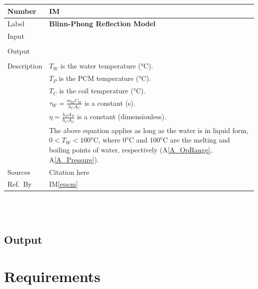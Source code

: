 \documentclass[12pt]{article}
\newcommand{\colAwidth}{0.13\textwidth}
\newcommand{\colBwidth}{0.82\textwidth}
\newcommand{\aref}[1]{A\ref{#1}}
\newcounter{instnum} %
\newcommand{\iref}[1]{IM\ref{#1}}
\begin{document}
\noindent
\begin{minipage}{\textwidth}
	\renewcommand*{\arraystretch}{1.5}
	\begin{tabular}{| p{\colAwidth} | p{\colBwidth}|}
		\hline
		\rowcolor[gray]{0.9}
		Number& IM{instnum}\theinstnum \label{ewat}\\
		\hline
		Label& \bf Blinn-Phong Reflection Model\\
		\hline
		Input& \\
		& \\
		\hline
		Output& \\
		& \\
		\hline
		Description&$T_W$ is the water temperature (\si{\celsius}).\\
		&$T_P$ is the PCM temperature (\si{\celsius}).\\
		&$T_C$ is the coil temperature (\si{\celsius}).\\
		&$\tau_W = \frac{m_W C_W}{h_C A_C}$ is a constant (\si{\second}).\\
		&$\eta = \frac{h_P A_P}{h_C A_C}$ is a constant (dimensionless).\\
		& The above equation applies as long as the water is in liquid form,
		$0<T_W<100^o\text{C}$, where $0^o\text{C}$ and $100^o\text{C}$ are the 
		melting
		and boiling points of water, respectively (\aref{A_OpRange}, 
		\aref{A_Pressure}).
		\\
		\hline
		Sources& Citation here \\
		\hline
		Ref.\ By & \iref{epcm}\\
		\hline
	\end{tabular}
\end{minipage}\\

~\newline

%
%

\subsection{Output} \label{sec_Output}    

\section{Requirements}
\end{document}
